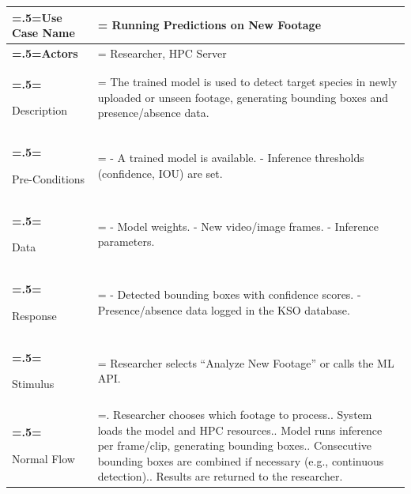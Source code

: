             \begin{table}[H] 
                \centering
                \small
                \begin{tabularx}{\textwidth}{|>{\bfseries\hsize=.5\hsize\linewidth=\hsize}X|
                >{\hsize=1.5\hsize\linewidth=\hsize}X|}
                \hline
                Use Case Name       & Running Predictions on New Footage \\ \hline
                
                Actors              & 
                Researcher, HPC Server \\ \hline
                
                Description         & 
                The trained model is used to detect target species in newly uploaded or 
                unseen footage, generating bounding boxes and presence/absence data. \\ \hline
                
                Pre-Conditions      & 
                - A trained model is available.\newline
                - Inference thresholds (confidence, IOU) are set. \\ \hline
                
                Data                & 
                - Model weights.\newline
                - New video/image frames.\newline
                - Inference parameters. \\ \hline
                
                Response            & 
                - Detected bounding boxes with confidence scores.\newline
                - Presence/absence data logged in the KSO database. \\ \hline
                
                Stimulus            & 
                Researcher selects ``Analyze New Footage'' or calls the ML API. \\ \hline
                
                Normal Flow         & 
                1. Researcher chooses which footage to process.\newline
                2. System loads the model and HPC resources.\newline
                3. Model runs inference per frame/clip, generating bounding boxes.\newline
                4. Consecutive bounding boxes are combined if necessary (e.g., continuous detection).\newline
                5. Results are returned to the researcher. \\ \hline
                

\end{tabularx}
\end{table}

